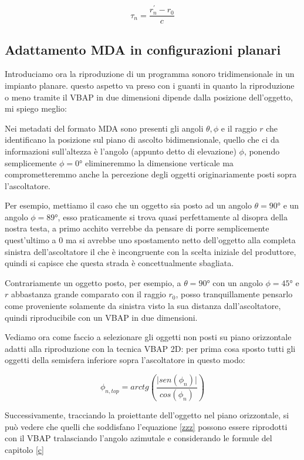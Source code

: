 \documentclass[12pt,a4paper]{report}
\begin{document}
\begin{equation}
\tau_{n} = \dfrac{r_n^{\prime}-r_0}{c}
\label{eq:tau}
\end{equation}

\subsection{Adattamento MDA in configurazioni planari}

Introduciamo ora la riproduzione di un programma sonoro tridimensionale in un impianto planare.  questo aspetto va preso con i guanti in quanto la riproduzione o meno tramite il VBAP in due dimensioni dipende dalla posizione dell'oggetto, mi spiego meglio:

Nei metadati del formato MDA sono presenti gli angoli $\theta, \phi$ e il raggio $r$ che identificano la posizione sul piano di ascolto bidimensionale, quello che ci da informazioni sull'altezza è l'angolo (appunto detto di elevazione) $\phi$, ponendo semplicemente $\phi=0°$ elimineremmo la dimensione verticale ma comprometteremmo anche la percezione degli oggetti originariamente posti sopra l'ascoltatore.

Per esempio, mettiamo il caso che un oggetto sia posto ad un angolo $	\theta= 90° $ e un angolo $\phi=89°$, esso praticamente si trova quasi perfettamente al disopra della nostra testa, a primo acchito verrebbe da pensare di porre semplicemente quest'ultimo a $0$ ma si avrebbe uno spostamento netto dell'oggetto alla completa sinistra dell'ascoltatore il che è incongruente con la scelta iniziale del produttore, quindi si capisce che questa strada è concettualmente sbagliata.

Contrariamente un oggetto posto, per esempio, a $\theta= 90°$ con un angolo $\phi=45°$ e $r$ abbastanza grande comparato con il raggio $r_0$, posso tranquillamente pensarlo come proveniente solamente da sinistra visto la sua distanza dall'ascoltatore, quindi riproducibile con un VBAP in due dimensioni.

Vediamo ora come faccio a selezionare gli oggetti non posti su piano orizzontale adatti alla riproduzione con la tecnica VBAP 2D: per prima cosa sposto tutti gli oggetti della semisfera inferiore sopra l'ascoltatore in questo modo:

\begin{equation}
\phi_{n,top} = arctg  \left( \dfrac{\vert sen(\phi_n) \vert}{ cos(\phi_n) } \right)
\label{  b}
\end{equation}

Successivamente, tracciando la proiettante dell'oggetto nel piano orizzontale, si può vedere che quelli che soddisfano l'equazione \ref{zzz} possono essere riprodotti con il VBAP tralasciando l'angolo azimutale e considerando le formule del capitolo \ref{c}
\end{document}
